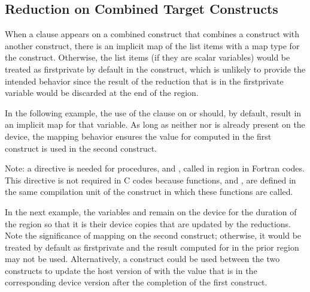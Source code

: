 \subsection{Reduction on Combined Target Constructs}
\label{subsec:target_reduction}

When a  clause appears on a combined construct that combines 
a  construct with another construct, there is an implicit map 
of the list items with a  map type for the  construct. 
Otherwise, the list items (if they are scalar variables) would be 
treated as firstprivate by default in the  construct, which 
is unlikely to provide the intended behavior since the result of the
reduction that is in the firstprivate variable would be discarded 
at the end of the  region.

In the following example, the use of the  clause on 
or  should, by default, result in an implicit  map for
that variable. As long as neither  nor  is already
present on the device, the mapping behavior ensures the value for
 computed in the first  construct is used in the
second  construct.

Note: a  directive is needed for procedures,
 and , called in  region in Fortran codes. 
This directive is not required in C codes because functions, 
and , are defined in the same compilation unit of the 
construct in which these functions are called.



In the next example,  the variables  and  remain on the
device for the duration of the  region so that it is
their device copies that are updated by the reductions. Note the significance
of mapping  on the second  construct; otherwise, it
would be treated by default as firstprivate and the result computed for
 in the prior  region may not be used. Alternatively, a
 construct could be used between the two
 constructs to update the host version of  with the
value that is in the corresponding device version after the completion of the
first construct.

